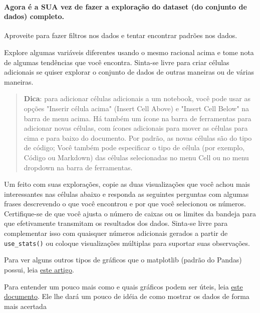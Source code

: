 \documentclass[11pt]{article}
\begin{document}
    \paragraph{Agora é a SUA vez de fazer a exploração do dataset (do
conjunto de dados)
completo.}\label{agora-uxe9-a-sua-vez-de-fazer-a-explorauxe7uxe3o-do-dataset-do-conjunto-de-dados-completo.}

Aproveite para fazer filtros nos dados e tentar encontrar padrões nos
dados.

    Explore algumas variáveis diferentes usando o mesmo racional acima e
tome nota de algumas tendências que você encontra. Sinta-se livre para
criar células adicionais se quiser explorar o conjunto de dados de
outras maneiras ou de várias maneiras.

\begin{quote}
\textbf{Dica}: para adicionar células adicionais a um notebook, você
pode usar as opções "Inserir célula acima" (Insert Cell Above) e "Insert
Cell Below" na barra de menu acima. Há também um ícone na barra de
ferramentas para adicionar novas células, com ícones adicionais para
mover as células para cima e para baixo do documento. Por padrão, as
novas células são do tipo de código; Você também pode especificar o tipo
de célula (por exemplo, Código ou Markdown) das células selecionadas no
menu Cell ou no menu dropdown na barra de ferramentas.
\end{quote}

Um feito com suas explorações, copie as duas visualizações que você
achou mais interessantes nas células abaixo e responda as seguintes
perguntas com algumas frases descrevendo o que você encontrou e por que
você selecionou os números. Certifique-se de que você ajusta o número de
caixas ou os limites da bandeja para que efetivamente transmitam os
resultados dos dados. Sinta-se livre para complementar isso com
quaisquer números adicionais gerados a partir de \texttt{use\_stats()}
ou coloque visualizações múltiplas para suportar suas observações.

    Para ver alguns outros tipos de gráficos que o matplotlib (padrão do
Pandas) possui, leia
\href{https://www.labri.fr/perso/nrougier/teaching/matplotlib/\#other-types-of-plots}{este
artigo}.

Para entender um pouco mais como e quais gráficos podem ser úteis, leia
\href{https://www.tableau.com/sites/default/files/media/Whitepapers/which_chart_v6_ptb.pdf}{este
documento}. Ele lhe dará um pouco de idéia de como mostrar os dados de
forma mais acertada
\end{document}
